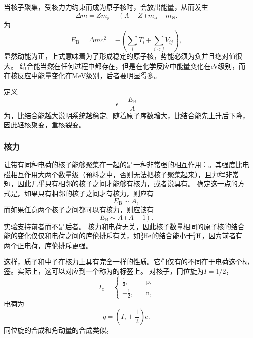 当核子聚集，受核力力约束而成为原子核时，会放出能量，从而发生
\begin{equation}
    \Delta m = Z m_\text{p} + (A - Z) m_\text{n} - m_\text{N}.
\end{equation}
为
\begin{equation}
    E_\text{B} = \Delta m c^2 = - \left( \sum_i T_i + \sum_{i < j} V_{ij} \right), 
\end{equation}
显然动能为正，上式意味着为了形成稳定的原子核，势能必须为负并且绝对值很大。
结合能当然在任何过程中都存在，但是在化学反应中能量变化在eV级别，而在核反应中能量变化在MeV级别，后者要明显得多。

定义
\begin{equation}
    \epsilon = \frac{E_\text{B}}{A} 
\end{equation}
为，比结合能越大说明系统越稳定。随着原子序数增大，比结合能先上升后下降，因此轻核聚变，重核裂变。

\subsubsection{核力}

让带有同种电荷的核子能够聚集在一起的是一种非常强的相互作用：。其强度比电磁相互作用大两个数量级（预料之中，否则无法把核子聚集起来），且力程非常短，因此几乎只有相邻的核子之间才能够有核力，或者说具有。
确定这一点的方式是，如果只有相邻的核子之间才有核力，则应有
\[
    E_\text{B} \sim A,
\]
而如果任意两个核子之间都可以有核力，则应该有
\[
    E_\text{B} \sim A(A-1).
\]
实验支持前者而不是后者。
核力和电荷无关，因此核子数量相同的原子核的结合能的变化仅仅和电荷之间的库伦排斥有关，如$\nuclear{He}{3}{2}$的结合能小于$\nuclear{H}{3}{1}$，因为前者有两个正电荷，库伦排斥更强。

这样，质子和中子在核力上具有完全一样的性质。它们仅有的不同在于电荷这个标签。实际上，这可以对应到一个称为的标签上。
对核子，同位旋为$I = 1/ 2$，
\begin{equation}
    I_z = \begin{cases}
        \frac{1}{2}, \quad &\text{p}, \\
        -\frac{1}{2}, \quad &\text{n},
    \end{cases}
\end{equation}
电荷为
\begin{equation}
    q = \left( I_z + \frac{1}{2} \right) e.
\end{equation}
同位旋的合成和角动量的合成类似。

